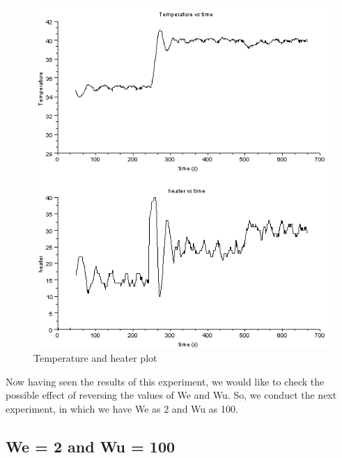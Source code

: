 \begin{figure}[H]
\centering
  \includegraphics[width=0.8\linewidth]{mpc/5_1_heater_final.png}
  \caption{Temperature and heater plot}
\end{figure}
Now having seen the results of this experiment, we would like to check the possible effect of reversing the values of We and Wu. So, we conduct the next experiment, in which we have We as 2 and Wu as 100.

\subsection{We = 2 and Wu = 100}

